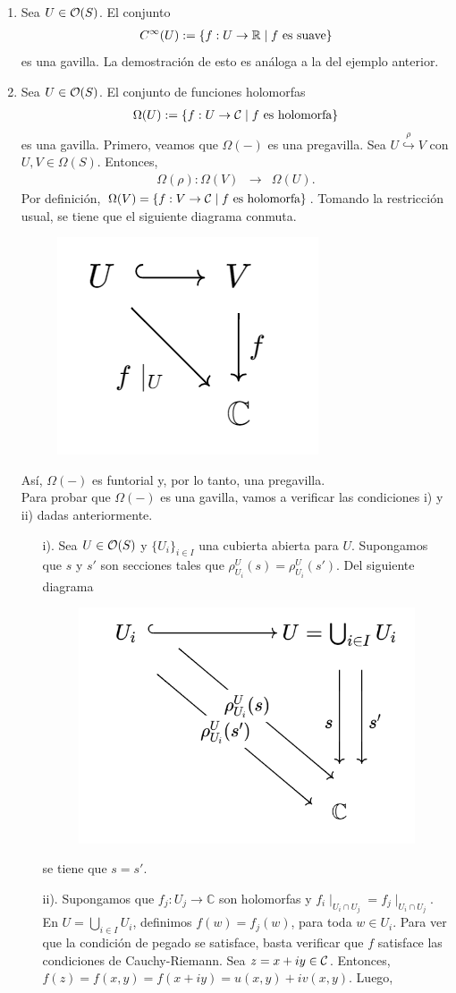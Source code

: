 \begin{ejp}
\begin{enumerate}
        \item Sea $U\in {\mathcal O}(S)$. El conjunto
        \begin{eqnarray*}
            C^\infty(U):=\{f:U\to{\mathbb R}\mid f \text{ es suave}\}
        \end{eqnarray*}
        es una gavilla. La demostración de esto es análoga a la del ejemplo anterior.
        \item Sea $U\in{\mathcal O}(S)$. El conjunto de funciones holomorfas
        \begin{eqnarray*}
            \Omega(U):=\{f:U\to{\mathcal C}\mid f\text{ es holomorfa}\}
        \end{eqnarray*}
        es una gavilla. Primero, veamos que $\Omega(-)$ es una pregavilla. Sea $U\overset{\rho}{\hookrightarrow} V$ con $U,V\in\Omega(S)$. Entonces, 
        \begin{eqnarray*}
            \Omega(\rho):\Omega(V)&\to&\Omega(U).
        \end{eqnarray*}
        Por definición, $\Omega(V)=\{f: V\to{\mathcal C}\mid f\text{ es holomorfa}\}$. Tomando la restricción usual, se tiene que el siguiente diagrama conmuta.
        \begin{figure}[H]
            \centering
            \includegraphics[width=0.2\linewidth]{img/gav3.png}
        \end{figure}
        Así, $\Omega(-)$ es funtorial y, por lo tanto, una pregavilla.\\
        Para probar que $\Omega(-)$ es una gavilla, vamos a verificar las condiciones i) y ii) dadas anteriormente.
        \begin{enumerate}
        \item[i).] Sea $U\in{\mathcal O}(S)$ y $\{U_i\}_{i\in I}$ una cubierta abierta para $U$. Supongamos que $s$ y $s'$ son secciones tales que $\rho^U_{U_i}(s)=\rho^U_{U_i}(s')$. Del siguiente diagrama
            \begin{figure}[H]
            \centering
            \includegraphics[width=0.4\linewidth]{img/diagram2.2.png}
        \end{figure}
        se tiene que $s=s'$.
        \item[ii).] Supongamos que $f_j:U_j\to\mathbb{C}$ son holomorfas y $f_i\mid_{U_i\cap U_j}=f_j\mid_{U_i\cap U_j}$. En $U=\bigcup_{i\in I}U_i$, definimos $f(w)=f_j(w)$, para toda $w\in U_i$. Para ver que la condición de pegado se satisface, basta verificar que $f$ satisface las condiciones de Cauchy-Riemann. Sea $z=x+iy\in{\mathcal C}$. Entonces, $f(z)=f(x,y)=f(x+iy)=u(x,y)+iv(x,y)$. Luego, 
   

\end{enumerate}
\end{enumerate}
\end{ejp}
